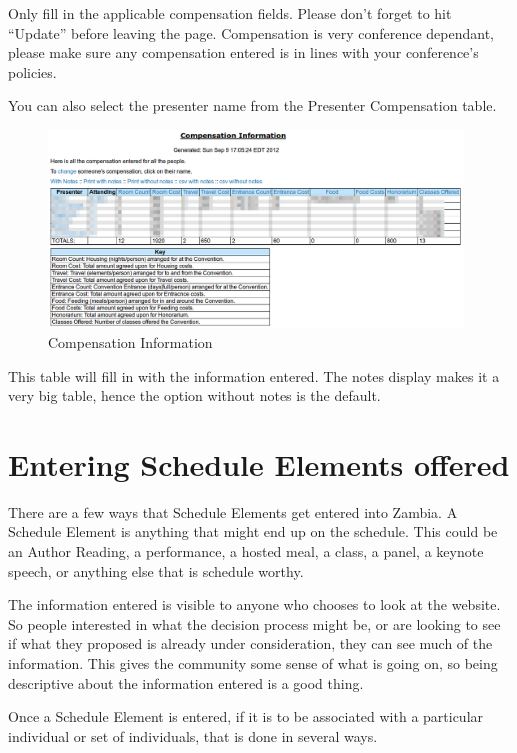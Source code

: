 \documentclass[tablesignature]{scrartcl}
\begin{document}
  Only fill in the applicable compensation fields.  Please don't
  forget to hit ``Update'' before leaving the page.  Compensation is
  very conference dependant, please make sure any compensation entered
  is in lines with your conference's policies.

  You can also select the presenter name from the Presenter
  Compensation table.


\begin{figure}[H]
\centering
\includegraphics[width=0.98\textwidth]{./Images/Compensation_Information.png}
\caption{\label{fig:Zambia_Presenter_Flow_Compensation_Information}Compensation Information}
\end{figure}

  This table will fill in with the information entered.  The notes
  display makes it a very big table, hence the option without notes is
  the default.
\section{Entering Schedule Elements offered}
\label{sec-5}


  There are a few ways that Schedule Elements get entered into Zambia.
  A Schedule Element is anything that might end up on the schedule.
  This could be an Author Reading, a performance, a hosted meal, a
  class, a panel, a keynote speech, or anything else that is schedule
  worthy. 

  The information entered is visible to anyone who chooses to look at
  the website.  So people interested in what the decision process
  might be, or are looking to see if what they proposed is already
  under consideration, they can see much of the information.  This
  gives the community some sense of what is going on, so being
  descriptive about the information entered is a good thing.

  Once a Schedule Element is entered, if it is to be associated with a
  particular individual or set of individuals, that is done in several
  ways.
\end{document}
